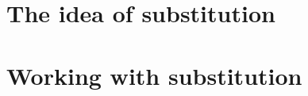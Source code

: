 \documentclass[newpage]{xourse}
\begin{document}
\part{The idea of substitution}

\part{Working with substitution}
\end{document}
